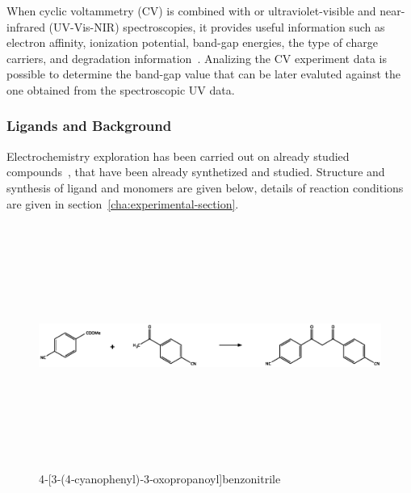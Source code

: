 \documentclass[../Master.tex]{subfiles}
\begin{document}
When cyclic voltammetry (CV) is combined with or ultraviolet-visible and near-infrared (UV-Vis-NIR) spectroscopies, it provides useful information such as electron affinity, ionization potential, band-gap energies, the type of charge carriers, and degradation information\ \cite{pluczyk_using_2018}. Analizing the CV experiment data is possible to determine the band-gap value that can be later evaluted against the one obtained from the spectroscopic UV data.

\subsubsection{Ligands and  Background}
Electrochemistry exploration has been carried out on already studied compounds\ \cite{carlucci_heterometallic_2010}, that have been already synthetized and studied. Structure and synthesis of ligand and monomers  are given below, details of reaction conditions are given in section\ \ref{cha:experimental-section}.

\begin{figure}[h!]
	\centering
	\includegraphics[width=16cm,height=8cm,keepaspectratio]{Structures/dicn-sint.eps}\caption{ 4‐[3‐(4‐cyanophenyl)‐3‐oxopropanoyl]benzonitrile}
\end{figure}

\end{document}
